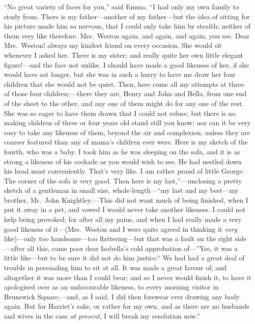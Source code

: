 ``No great variety of faces for you,'' said Emma.  ``I had only my
own family to study from.  There is my father---another of my
father---but the idea of sitting for his picture made him so nervous,
that I could only take him by stealth; neither of them very
like therefore.  Mrs.\ Weston again, and again, and again, you see.
Dear Mrs.\ Weston! always my kindest friend on every occasion.
She would sit whenever I asked her.  There is my sister; and really
quite her own little elegant figure!---and the face not unlike.
I should have made a good likeness of her, if she would have
sat longer, but she was in such a hurry to have me draw her four
children that she would not be quiet.  Then, here come all my
attempts at three of those four children;---there they are,
Henry and John and Bella, from one end of the sheet to the other,
and any one of them might do for any one of the rest.  She was so
eager to have them drawn that I could not refuse; but there is no
making children of three or four years old stand still you know;
nor can it be very easy to take any likeness of them, beyond the
air and complexion, unless they are coarser featured than any
of mama's children ever were.  Here is my sketch of the fourth,
who was a baby.  I took him as he was sleeping on the sofa, and it
is as strong a likeness of his cockade as you would wish to see.
He had nestled down his head most conveniently.  That's very like.
I am rather proud of little George.  The corner of the sofa is very good.
Then here is my last,''---unclosing a pretty sketch of a gentleman
in small size, whole-length---``my last and my best---my brother,
Mr.\ John Knightley.---This did not want much of being finished, when I
put it away in a pet, and vowed I would never take another likeness.
I could not help being provoked; for after all my pains, and when I
had really made a very good likeness of it---(Mrs.\ Weston and I
were quite agreed in thinking it \emph{very} like)---only too handsome---too
flattering---but that was a fault on the right side---after
all this, came poor dear Isabella's cold approbation of---''Yes,
it was a little like---but to be sure it did not do him justice.``
We had had a great deal of trouble in persuading him to sit at all.
It was made a great favour of; and altogether it was more than I
could bear; and so I never would finish it, to have it apologised
over as an unfavourable likeness, to every morning visitor in
Brunswick Square;---and, as I said, I did then forswear ever drawing
any body again.  But for Harriet's sake, or rather for my own,
and as there are no husbands and wives in the case \emph{at present},
I will break my resolution now.''

